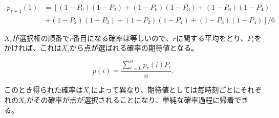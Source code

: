 \begin{align}
p_{r+1}(1) &= \left[(1-P_{0})(1-P_{2}) + (1-P_{0})(1-P_{3}) + (1-P_{0})(1-P_{4}) \right.\\
&\ \left. + (1-P_{2})(1-P_{3}) + (1-P_{2})(1-P_{4}) + (1-P_{3})(1-P_{4}) \right]/6
\end{align}

$X_{i}$が選択権の順番で$r$番目になる確率は等しいので、$r$に関する平均をとり、$P_{i}$をかければ、これは$X_{i}$から点が選ばれる確率の期待値となる。

$$p(i) = \frac{\sum_{r=0}^{n}p_{r}(i)P_{i}}{n}.$$

このとき得られた確率は$X_{i}$によって異なり、期待値としては毎時刻ごとにそれぞれの$X_{i}$がその確率が点が選択されることになり、単純な確率過程に帰着できる。

